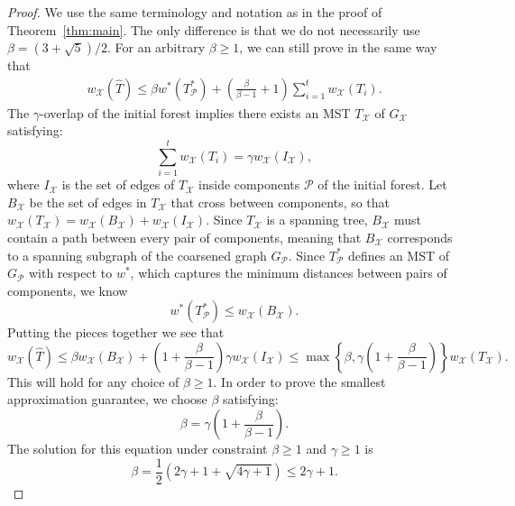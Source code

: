 \begin{proof}
	We use the same terminology and notation as in the proof of Theorem~\ref{thm:main}. The only difference is that we do not necessarily use $\beta = (3+ \sqrt{5})/2$. For an arbitrary $\beta \geq 1$, we can still prove in the same way that
	\begin{align}
		\label{eq:start}
		w_\mathcal{X}(\hat{T}) \leq  \beta w^*(T^*_\mathcal{P}) + \left(\frac{\beta}{\beta-1} + 1\right) \sum_{i = 1}^t w_\mathcal{X}(T_i).
	\end{align}
	The $\gamma$-overlap of the initial forest implies there exists an MST $T_\mathcal{X}$ of $G_\mathcal{X}$ satisfying:
	\begin{equation}
		\label{eq:ieratio}
		\sum_{i = 1}^t w_\mathcal{X}(T_i) = \gamma w_\mathcal{X}(I_\mathcal{X}),
	\end{equation}
	where $I_\mathcal{X}$ is the set of edges of $T_\mathcal{X}$ inside components $\mathcal{P}$ of the initial forest. Let $B_\mathcal{X}$ be the set of edges in $T_\mathcal{X}$ that cross between components, so that $w_\mathcal{X}(T_\mathcal{X}) = w_\mathcal{X}(B_\mathcal{X}) + w_\mathcal{X}(I_\mathcal{X})$. Since $T_\mathcal{X}$ is a spanning tree, $B_\mathcal{X}$ must contain a path between every pair of components, meaning that $B_\mathcal{X}$ corresponds to a spanning subgraph of the coarsened graph $G_\mathcal{P}$. Since $T_\mathcal{P}^*$ defines an MST of $G_\mathcal{P}$ with respect to $w^*$, which captures the minimum distances between pairs of components, we know
	\begin{equation}
		w^*(T_\mathcal{P}^*) \leq w_\mathcal{X}(B_\mathcal{X}).
	\end{equation}
	Putting the pieces together we see that
	\begin{equation}
		w_\mathcal{X}(\hat{T}) \leq  \beta w_\mathcal{X}(B_\mathcal{X}) + \left( 1 + \frac{\beta}{\beta-1}\right) \gamma w_\mathcal{X}(I_\mathcal{X}) \leq \max \left\{\beta, \gamma\left(1 + \frac{\beta}{\beta -1}\right)  \right\} w_\mathcal{X}(T_\mathcal{X}).
	\end{equation}
	This will hold for any choice of $\beta \geq 1$. In order to prove the smallest approximation guarantee, we choose $\beta$ satisfying:
	\begin{equation*}
		\beta = \gamma\left(1 + \frac{\beta}{\beta -1}\right).
	\end{equation*}
	The solution for this equation under constraint $\beta \geq 1$ and $\gamma \geq 1$ is 
	\begin{equation*}
		\beta = \frac{1}{2}\left(2\gamma + 1 + \sqrt{4\gamma + 1} \right) \leq 2\gamma+ 1.
	\end{equation*}
\end{proof}


